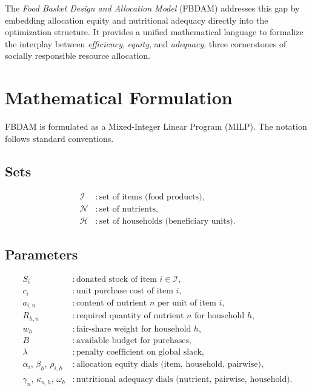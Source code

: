 \documentclass[preprint,12pt]{elsarticle}
\begin{document}
The \emph{Food Basket Design and Allocation Model} (FBDAM) addresses this gap by embedding allocation equity and nutritional adequacy directly into the optimization structure. It provides a unified mathematical language to formalize the interplay between \emph{efficiency}, \emph{equity}, and \emph{adequacy}, three cornerstones of socially responsible resource allocation.

\section{Mathematical Formulation}
\label{sec:model}
FBDAM is formulated as a Mixed-Integer Linear Program (MILP). The notation follows standard conventions.

\subsection{Sets}
\begin{align*}
\mathcal{I} &: \text{set of items (food products)},\\
\mathcal{N} &: \text{set of nutrients},\\
\mathcal{H} &: \text{set of households (beneficiary units)}.
\end{align*}

\subsection{Parameters}
\begin{align*}
S_i & : \text{donated stock of item } i \in \mathcal{I},\\
c_i & : \text{unit purchase cost of item } i,\\
a_{i,n} & : \text{content of nutrient } n \text{ per unit of item } i,\\
R_{h,n} & : \text{required quantity of nutrient } n \text{ for household } h,\\
w_h & : \text{fair-share weight for household } h,\\
B & : \text{available budget for purchases},\\
\lambda & : \text{penalty coefficient on global slack},\\
\alpha_i,\, \beta_h,\, \rho_{i,h} & : \text{allocation equity dials (item, household, pairwise)},\\
\gamma_n,\, \kappa_{n,h}, \, \omega_h & : \text{nutritional adequacy dials (nutrient, pairwise, household)}.
\end{align*}
\end{document}
